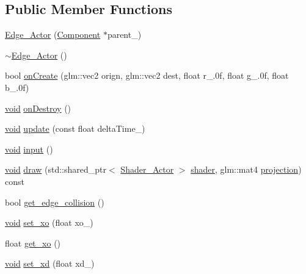 \subsection*{Public Member Functions}
\begin{DoxyCompactItemize}
\item 
\hyperlink{classEdge__Actor_ac707b4097a2de1a388deec93ac83de98}{Edge\+\_\+\+Actor} (\hyperlink{classComponent}{Component} $\ast$parent\+\_\+)
\item 
\hyperlink{classEdge__Actor_aee2346e89a348a9725d43c6a11c697f8}{$\sim$\+Edge\+\_\+\+Actor} ()
\item 
bool \hyperlink{classEdge__Actor_a0d8e90af66e85a8f4d1f5b0ecde6e99e}{on\+Create} (glm\+::vec2 orign, glm\+::vec2 dest, float r\+\_.\+0f, float g\+\_.\+0f, float b\+\_.\+0f)
\item 
\hyperlink{imgui__impl__opengl3__loader_8h_ac668e7cffd9e2e9cfee428b9b2f34fa7}{void} \hyperlink{classEdge__Actor_ae7a429d48b86442154c93eb65bc8b22d}{on\+Destroy} ()
\item 
\hyperlink{imgui__impl__opengl3__loader_8h_ac668e7cffd9e2e9cfee428b9b2f34fa7}{void} \hyperlink{classEdge__Actor_a8ae8a19c72b58522755d2d0a395fc1ea}{update} (const float delta\+Time\+\_\+)
\item 
\hyperlink{imgui__impl__opengl3__loader_8h_ac668e7cffd9e2e9cfee428b9b2f34fa7}{void} \hyperlink{classEdge__Actor_a9f2bf6813472357c045d48cd76658e30}{input} ()
\item 
\hyperlink{imgui__impl__opengl3__loader_8h_ac668e7cffd9e2e9cfee428b9b2f34fa7}{void} \hyperlink{classEdge__Actor_a90887ba227fa0edf7cd7fdfd5d13f475}{draw} (std\+::shared\+\_\+ptr$<$ \hyperlink{classShader__Actor}{Shader\+\_\+\+Actor} $>$ \hyperlink{imgui__impl__opengl3__loader_8h_a57b2a96adb1d51204909a82d861e395e}{shader}, glm\+::mat4 \hyperlink{main__menu__state_8cpp_a565d92bfbcc4a481d2d35f3850a382f7}{projection}) const
\item 
bool \hyperlink{classEdge__Actor_ae0c85d2808d37ec71202b545f88e5881}{get\+\_\+edge\+\_\+collision} ()
\item 
\hyperlink{imgui__impl__opengl3__loader_8h_ac668e7cffd9e2e9cfee428b9b2f34fa7}{void} \hyperlink{classEdge__Actor_a4494e28b1ac2a197243f6ad6f76955f9}{set\+\_\+xo} (float xo\+\_\+)
\item 
float \hyperlink{classEdge__Actor_a66b2b088ec38268d42823c7faa6a3547}{get\+\_\+xo} ()
\item 
\hyperlink{imgui__impl__opengl3__loader_8h_ac668e7cffd9e2e9cfee428b9b2f34fa7}{void} \hyperlink{classEdge__Actor_a65bfa5124e666e68fb2a3b1aae8bc203}{set\+\_\+xd} (float xd\+\_\+)

\end{DoxyCompactItemize}
